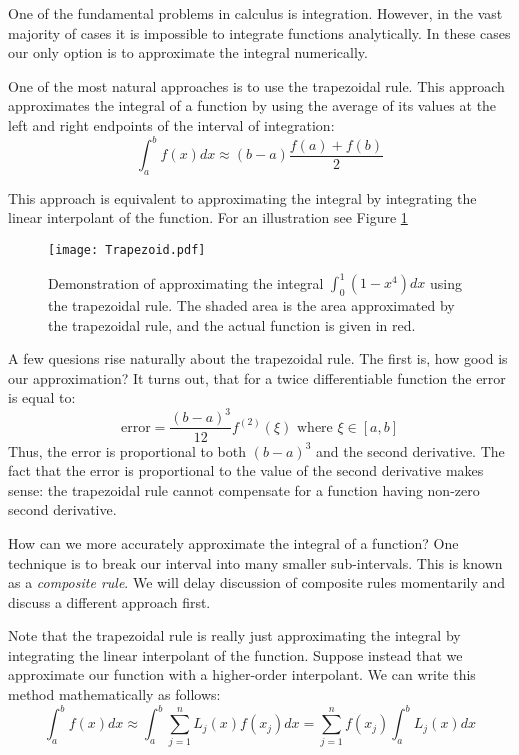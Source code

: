 

One of the fundamental problems in calculus is integration. However, in the vast majority of cases it is impossible to integrate functions analytically. In these cases our only option is to approximate the integral numerically.

One of the most natural approaches is to use the trapezoidal rule. This approach approximates the integral of a function by using the average of its values at the left and right endpoints of the interval of integration:
\[
\int_a^b f(x) dx \approx (b-a)\frac{f(a) + f(b)}{2}
\]

This approach is equivalent to approximating the integral by integrating the linear interpolant of the function. For an illustration see Figure \ref{Fig:Trapezoidal}

\begin{figure}
\begin{center}
\texttt{[image: Trapezoid.pdf]}
\caption{Demonstration of approximating the integral $\int_0^1 (1-x^4)dx$ using the trapezoidal rule. The shaded area is the area approximated by the trapezoidal rule, and the actual function is given in red.}
\label{Fig:Trapezoidal}
\end{center}
\end{figure}

A few quesions rise naturally about the trapezoidal rule. The first is, how good is our approximation? It turns out, that for a twice differentiable function the error is equal to:
\[
\mbox{error} = \frac{(b-a)^3}{12}f^{(2)}(\xi) \mbox{ where } \xi \in [a,b]
\]
Thus, the error is proportional to both $(b-a)^3$ and the second derivative. The fact that the error is proportional to the value of the second derivative makes sense: the trapezoidal rule cannot compensate for a function having non-zero second derivative.

How can we more accurately approximate the integral of a function? One technique is to break our interval into many smaller sub-intervals. This is known as a \emph{composite rule}. We will delay discussion of composite rules momentarily and discuss a different approach first.

Note that the trapezoidal rule is really just approximating the integral by integrating the linear interpolant of the function. Suppose instead that we approximate our function with a higher-order interpolant. We can write this method mathematically as follows:
\[
\int_a^b f(x) dx \approx \int_a^b \sum_{j=1}^n L_j(x)f(x_j) dx = \sum_{j=1}^n f(x_j)\int_a^b L_j(x) dx
\]

